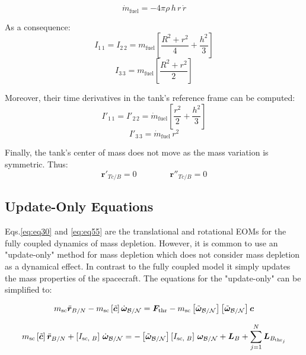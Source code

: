 \begin{equation}
	\dot{m}_\text{fuel} = - 4\pi\rho\,h\,r\,\dot{r}
\end{equation}

As a consequence:
\begin{equation}
	I_{1\,1} = I_{2\,2} = m_\text{fuel}\left[\frac{R^2+ r^2}{4} +\frac{h^2}{3}\right]
\end{equation}
\begin{equation}
	I_{3\,3} = m_\text{fuel}\left[\frac{R^2+ r^2}{2} \right]
\end{equation}

Moreover, their time derivatives in the tank's reference frame can be computed:
\begin{equation}
	I'_{1\,1} = I'_{2\,2} = \dot{m}_\text{fuel}\left[\frac{r^2}{2}+\frac{h^2}{3}\right]
\end{equation}
\begin{equation}
	I'_{3\,3}  = \dot{m}_\text{fuel}\,r^2
\end{equation}

Finally, the tank's center of mass does not move as the mass variation is symmetric. Thus:
\begin{equation}
	\bm{r}'_{Tc/B} = 0 \qquad\qquad \bm{r}''_{Tc/B}=0
\end{equation}

\subsection{Update-Only Equations}

Eqs.\eqref{eq:eq30} and \eqref{eq:eq55} are the translational and rotational EOMs for the fully coupled dynamics of mass depletion. However, it is common to use an "update-only" method for mass depletion which does not consider mass depletion as a dynamical effect. In contrast to the fully coupled model it simply updates the mass properties of the spacecraft. The equations for the "update-only" can be simplified to:

\begin{equation}\label{eq:eq31}
m_{\text{sc}} \ddot{\bm{r}}_{B/N} - m_{\text{sc}} \left[\tilde{\bm{c}}\right]\dot{\bm{\omega}}_{\cal{B}/\cal{N}} =  \bm{F}_{\text{thr}} - m_{\text{sc}} \left[\tilde{\bm{\omega}}_{\cal{B}/\cal{N}}\right] \left[\tilde{\bm{\omega}}_{\cal{B}/\cal{N}}\right] \bm{c} 
\end{equation}

\begin{equation}\label{eq:eq55}
m_{\text{sc}} \left[\tilde{\bm{c}}\right]\ddot{\bm{r}}_{B/N} + \left[I_{\text{sc, }B}\right]\,\dot{\bm{\omega}}_{\cal{B}/\cal{N}} = - \left[\tilde{\bm{\omega}}_{\cal{B}/\cal{N}}\right]\left[I_{\text{sc, }B}\right]\,\bm{\omega}_{\cal{B}/\cal{N}}
+ \bm{L}_{B} + \sum_{j=1}^{N}\bm{L}_{B_{\text{thr}_j}} 
\end{equation}



